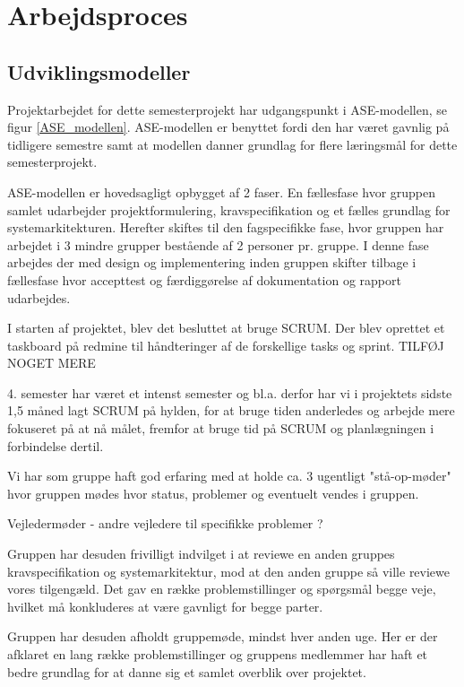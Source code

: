 
\chapter{Arbejdsproces}

\section{Udviklingsmodeller}

Projektarbejdet for dette semesterprojekt har udgangspunkt i ASE-modellen, se figur \ref{ASE_modellen}. ASE-modellen er benyttet fordi den har været gavnlig på tidligere semestre samt at modellen danner grundlag for flere læringsmål for dette semesterprojekt.

ASE-modellen er hovedsagligt opbygget af 2 faser. En fællesfase hvor gruppen samlet udarbejder projektformulering, kravspecifikation og et fælles grundlag for systemarkitekturen. Herefter skiftes til den fagspecifikke fase, hvor gruppen har arbejdet i 3 mindre grupper bestående af 2 personer pr. gruppe. I denne fase arbejdes der med design og implementering inden gruppen skifter tilbage i fællesfase hvor accepttest og færdiggørelse af dokumentation og rapport udarbejdes. 


I starten af projektet, blev det besluttet at bruge SCRUM. Der blev oprettet et taskboard på redmine til håndteringer af de forskellige tasks og sprint. TILFØJ NOGET MERE

4. semester har været et intenst semester og bl.a. derfor har vi i projektets sidste 1,5 måned lagt SCRUM på hylden, for at bruge tiden anderledes og arbejde mere fokuseret på at nå målet, fremfor at bruge tid på SCRUM og planlægningen i forbindelse dertil. 

Vi har som gruppe haft god erfaring med at holde ca. 3 ugentligt "stå-op-møder" hvor gruppen mødes hvor status, problemer og eventuelt vendes i gruppen. 

Vejledermøder - andre vejledere til specifikke problemer ?

Gruppen har desuden frivilligt indvilget i at reviewe en anden gruppes kravspecifikation og systemarkitektur, mod at den anden gruppe så ville reviewe vores tilgengæld. Det gav en række problemstillinger og spørgsmål begge veje, hvilket må konkluderes at være gavnligt for begge parter.

Gruppen har desuden afholdt gruppemøde, mindst hver anden uge. Her er der afklaret en lang række problemstillinger og gruppens medlemmer har haft et bedre grundlag for at danne sig et samlet overblik over projektet. 

